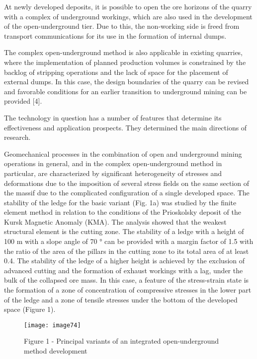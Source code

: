 \begin{multicols}{2}
At newly developed deposits, it is possible to open the ore horizons of
the quarry with a complex of underground workings, which are also used
in the development of the open-underground tier. Due to this, the
non-working side is freed from transport communications for its use in
the formation of internal dumps.

The complex open-underground method is also applicable in existing
quarries, where the implementation of planned production volumes is
constrained by the backlog of stripping operations and the lack of space
for the placement of external dumps. In this case, the design boundaries
of the quarry can be revised and favorable conditions for an earlier
transition to underground mining can be provided {[}4{]}.

The technology in question has a number of features that determine its
effectiveness and application prospects. They determined the main
directions of research.

Geomechanical processes in the combination of open and underground
mining operations in general, and in the complex open-underground method
in particular, are characterized by significant heterogeneity of
stresses and deformations due to the imposition of several stress fields
on the same section of the massif due to the complicated configuration
of a single developed space. The stability of the ledge for the basic
variant (Fig. 1a) was studied by the finite element method in relation
to the conditions of the Prioskolsky deposit of the Kursk Magnetic
Anomaly (KMA). The analysis showed that the weakest structural element
is the cutting zone. The stability of a ledge with a height of 100 m
with a slope angle of 70 ° can be provided with a margin factor of 1.5
with the ratio of the area of the pillars in the cutting zone to its
total area of at least 0.4. The stability of the ledge of a higher
height is achieved by the exclusion of advanced cutting and the
formation of exhaust workings with a lag, under the bulk of the
collapsed ore mass. In this case, a feature of the stress-strain state
is the formation of a zone of concentration of compressive stresses in
the lower part of the ledge and a zone of tensile stresses under the
bottom of the developed space (Figure 1).
\end{multicols}

\begin{figure}[H]
    \centering
    \texttt{[image: image74]}
    \caption*{a -- without loading the sides and ledge with rock mass; b -- with
partial loading of the ledge with broken rock; c -- with the completion
of deep horizons in an open way without additional separation of the
sides of the quarry; d, е -- with full loading of the ledge and sides of
the worked space, respectively, with bottom and end ore release; 1 --
non-working side of the quarry; 2 -- internal dump; 3 -- ore mass; 4 --
ledge of the open-underground tier; 5 -- working side of the quarry; 6
-- parallel descending wells; 7 -- output workings;
8 -- loading of the ledge; 9 -- fan wells}
    \caption*{Figure 1 - Principal variants of an integrated open-underground method development}
\end{figure}

